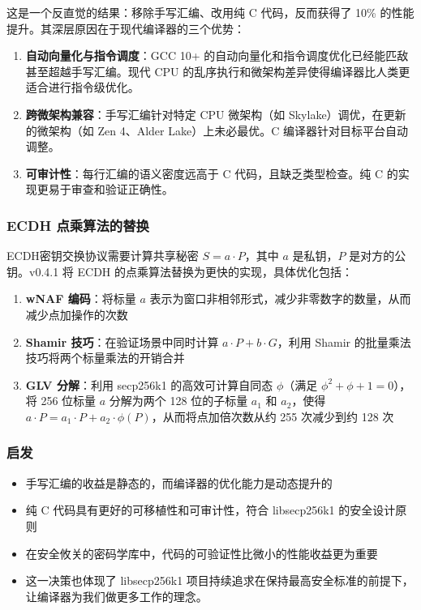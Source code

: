 \documentclass[a4paper,12pt]{ctexart}
\begin{document}
这是一个反直觉的结果：移除手写汇编、改用纯 C 代码，反而获得了 10\% 的性能提升。其深层原因在于现代编译器的三个优势：

\begin{enumerate}[leftmargin=*]
  \item \textbf{自动向量化与指令调度}：GCC 10+ 的自动向量化和指令调度优化已经能匹敌甚至超越手写汇编。现代 CPU 的乱序执行和微架构差异使得编译器比人类更适合进行指令级优化。
  \item \textbf{跨微架构兼容}：手写汇编针对特定 CPU 微架构（如 Skylake）调优，在更新的微架构（如 Zen 4、Alder Lake）上未必最优。C 编译器针对目标平台自动调整。
  \item \textbf{可审计性}：每行汇编的语义密度远高于 C 代码，且缺乏类型检查。纯 C 的实现更易于审查和验证正确性。
\end{enumerate}

\subsubsection{ECDH 点乘算法的替换}

ECDH密钥交换协议需要计算共享秘密 $S = a \cdot P$，其中 $a$ 是私钥，$P$ 是对方的公钥。v0.4.1 将 ECDH 的点乘算法替换为更快的实现，具体优化包括：

\begin{enumerate}[leftmargin=*]
  \item \textbf{wNAF 编码}：将标量 $a$ 表示为窗口非相邻形式，减少非零数字的数量，从而减少点加操作的次数
  \item \textbf{Shamir 技巧}：在验证场景中同时计算 $a \cdot P + b \cdot G$，利用 Shamir 的批量乘法技巧将两个标量乘法的开销合并
  \item \textbf{GLV 分解}：利用 secp256k1 的高效可计算自同态 $\phi$（满足 $\phi^2 + \phi + 1 = 0$），将 256 位标量 $a$ 分解为两个 128 位的子标量 $a_1$ 和 $a_2$，使得 $a \cdot P = a_1 \cdot P + a_2 \cdot \phi(P)$，从而将点加倍次数从约 255 次减少到约 128 次
\end{enumerate}

\subsubsection{启发}

\begin{itemize}[leftmargin=*]
  \item 手写汇编的收益是静态的，而编译器的优化能力是动态提升的
  \item 纯 C 代码具有更好的可移植性和可审计性，符合 libsecp256k1 的安全设计原则
  \item 在安全攸关的密码学库中，代码的可验证性比微小的性能收益更为重要
  \item 这一决策也体现了 libsecp256k1 项目持续追求在保持最高安全标准的前提下，让编译器为我们做更多工作的理念。

\end{itemize}
\end{document}
